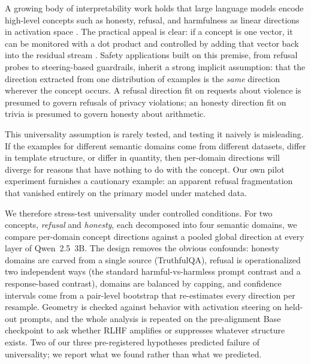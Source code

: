 \documentclass[11pt]{article}
\begin{document}
A growing body of interpretability work holds that large language models
encode high-level concepts such as honesty, refusal, and harmfulness as
linear directions in activation space \citep{zou2023representation,
marks2023geometry}. The practical appeal is clear: if a concept is one
vector, it can be monitored with a dot product and controlled by adding that
vector back into the residual stream \citep{turner2023activation,
li2024inference}. Safety applications built on this premise, from refusal
probes to steering-based guardrails, inherit a strong implicit assumption:
that the direction extracted from one distribution of examples is the
\emph{same} direction wherever the concept occurs. A refusal direction fit
on requests about violence is presumed to govern refusals of privacy
violations; an honesty direction fit on trivia is presumed to govern honesty
about arithmetic.

This universality assumption is rarely tested, and testing it naively is
misleading. If the examples for different semantic domains come from
different datasets, differ in template structure, or differ in quantity,
then per-domain directions will diverge for reasons that have nothing to do
with the concept. Our own pilot experiment furnishes a cautionary example:
an apparent refusal fragmentation that vanished entirely on the primary
model under matched data.

We therefore stress-test universality under controlled conditions. For two
concepts, \textit{refusal} and \textit{honesty}, each decomposed into four
semantic domains, we compare per-domain concept directions against a pooled
global direction at every layer of Qwen~2.5~3B. The design removes the
obvious confounds: honesty domains are carved from a single source
(TruthfulQA), refusal is operationalized two independent ways (the standard
harmful-vs-harmless prompt contrast and a response-based contrast), domains
are balanced by capping, and confidence intervals come from a pair-level
bootstrap that re-estimates every direction per resample. Geometry is
checked against behavior with activation steering on held-out prompts, and
the whole analysis is repeated on the pre-alignment Base checkpoint to ask
whether RLHF amplifies or suppresses whatever structure exists. Two of our
three pre-registered hypotheses predicted failure of universality; we report
what we found rather than what we predicted.
\end{document}
